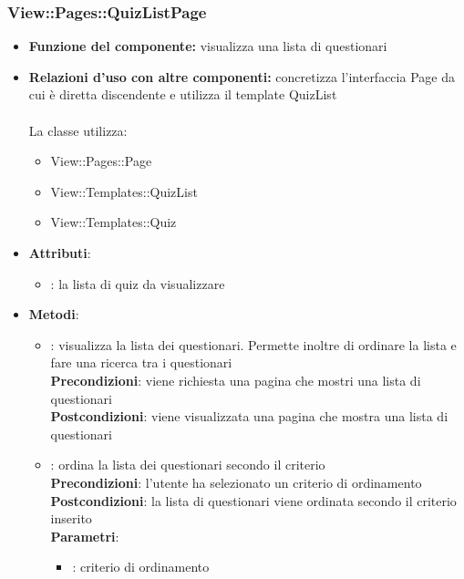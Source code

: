 \subsubsection{View::Pages::QuizListPage}
\begin{itemize}
\item\textbf{Funzione del componente:} visualizza una lista di questionari
				\item\textbf{Relazioni d'uso con altre componenti:} concretizza l'interfaccia Page da cui è diretta discendente e utilizza il template QuizList\\ \\
La classe utilizza:
	\begin{itemize}
		\item View::Pages::Page\\
		\item View::Templates::QuizList\\
		\item View::Templates::Quiz\\
	\end{itemize}
\item\textbf{Attributi}:
	\begin{itemize}
		\item{}: la lista di quiz da visualizzare\\
	\end{itemize}
\item\textbf{Metodi}:
	\begin{itemize}
		\item{}: visualizza la lista dei questionari. Permette inoltre di ordinare la lista e fare una ricerca tra i questionari\\
			\textbf{Precondizioni}: viene richiesta una pagina che mostri una lista di questionari\\
			\textbf{Postcondizioni}: viene visualizzata una pagina che mostra una lista di questionari\\
		\item{}: ordina la lista dei questionari secondo il criterio \\
			\textbf{Precondizioni}: l'utente ha selezionato un criterio di ordinamento\\
			\textbf{Postcondizioni}: la lista di questionari viene ordinata secondo il criterio inserito\\
			\textbf{Parametri}:
				\begin{itemize}
					\item{}: criterio di ordinamento\\

\end{itemize}
\end{itemize}
\end{itemize}
